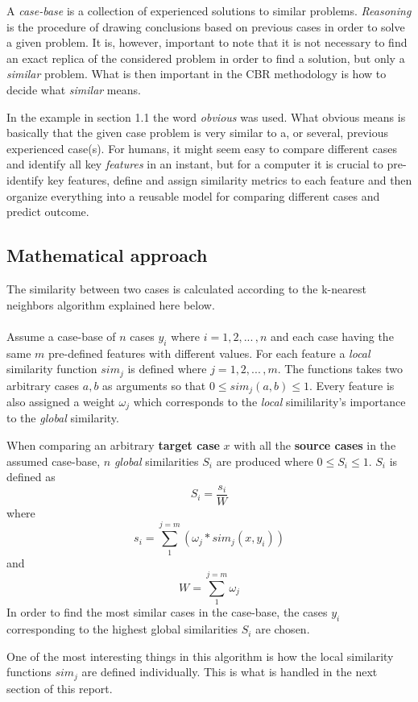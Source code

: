 \documentclass[12pt]{article}
\begin{document}
A \textit{case-base} is a collection of experienced solutions to similar problems. \textit{Reasoning} is the procedure of drawing conclusions based on previous cases in order to solve a given problem. It is, however, important to note that it is not necessary to find an exact replica of the considered problem in order to find a solution, but only a \textit{similar} problem. What is then important in the CBR methodology is how to decide what \textit{similar} means. 

In the example in section 1.1 the word \textit{obvious} was used. What obvious means is basically that the given case problem is very similar to a, or several, previous experienced case(s). For humans, it might seem easy to compare different cases and identify all key \textit{features} in an instant, but for a computer it is crucial to pre-identify key features, define and assign similarity metrics to each feature and then organize everything into a reusable model for comparing different cases and predict outcome. \cite{cbr}

\subsection{Mathematical approach}
\label{sec:math}

The similarity between two cases is calculated according to the k-nearest neighbors algorithm explained here below. \\\\
Assume a case-base of $n$ cases $y_i$ where $i=1,2,...\,,n$ and each case having the same $m$ pre-defined features with different values. For each feature a \textit{local} similarity function $sim_j$ is defined where $j=1,2,...\,,m$. The functions takes two arbitrary cases $a,b$ as arguments so that $0 \leq sim_j(a,b) \leq 1$. Every feature is also assigned a weight $\omega_j$ which corresponds to the \textit{local} simililarity's importance to the \textit{global} similarity. 

When comparing an arbitrary \textbf{target case} $x$ with all the \textbf{source cases} in the assumed case-base, $n$ \textit{global} similarities $S_i$ are produced where $0 \leq S_i \leq 1$. $S_i$ is defined as $$S_i=\frac{s_i}{W}$$ where $$s_i=\sum_{1}^{j=m} (\omega_j * sim_j(x,y_i))$$ and $$W=\sum_{1}^{j=m}\omega_j$$
In order to find the most similar cases in the case-base, the cases $y_i$ corresponding to the highest global similarities $S_i$ are chosen. \cite{cbr}

One of the most interesting things in this algorithm is how the local similarity functions $sim_j$ are defined individually. This is what is handled in the next section of this report. 
\end{document}
